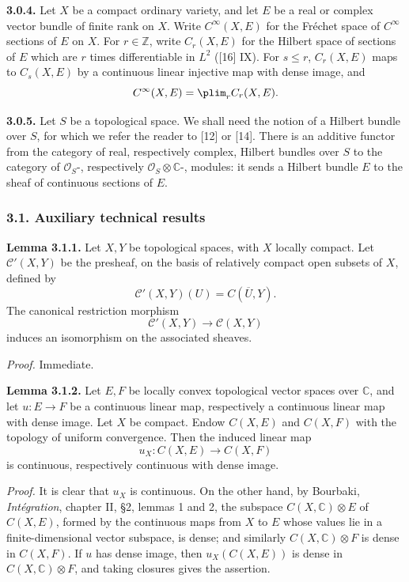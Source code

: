 \textbf{3.0.4.} Let $X$ be a compact ordinary variety, and let $E$ be a real or complex vector bundle of finite rank on $X$. Write $C^\infty(X,E)$ for the Fréchet space of $C^\infty$ sections of $E$ on $X$. For $r\in\mathbb Z$, write $C_r(X,E)$ for the Hilbert space of sections of $E$ which are $r$ times differentiable in $L^2$ ([16] IX). For $s\le r$, $C_r(X,E)$ maps to $C_s(X,E)$ by a continuous linear injective map with dense image, and
\[
 C^\infty(X,E)=\plim_r C_r(X,E).
\]

\textbf{3.0.5.} Let $S$ be a topological space. We shall need the notion of a Hilbert bundle over $S$, for which we refer the reader to [12] or [14]. There is an additive functor from the category of real, respectively complex, Hilbert bundles over $S$ to the category of $\mathcal O_S$-, respectively $\mathcal O_S\otimes\mathbb C$-, modules: it sends a Hilbert bundle $E$ to the sheaf of continuous sections of $E$.

\subsubsection*{3.1. Auxiliary technical results}

\textbf{Lemma 3.1.1.} Let $X,Y$ be topological spaces, with $X$ locally compact. Let $\mathcal C'(X,Y)$ be the presheaf, on the basis of relatively compact open subsets of $X$, defined by
\[
 \mathcal C'(X,Y)(U)=C(\overline U,Y).
\]
The canonical restriction morphism
\[
 \mathcal C'(X,Y)\longrightarrow \mathcal C(X,Y)
\]
induces an isomorphism on the associated sheaves.

\emph{Proof.} Immediate.

\textbf{Lemma 3.1.2.} Let $E,F$ be locally convex topological vector spaces over $\mathbb C$, and let $u:E\to F$ be a continuous linear map, respectively a continuous linear map with dense image. Let $X$ be compact. Endow $C(X,E)$ and $C(X,F)$ with the topology of uniform convergence. Then the induced linear map
\[
 u_X:C(X,E)\longrightarrow C(X,F)
\]
is continuous, respectively continuous with dense image.

\emph{Proof.} It is clear that $u_X$ is continuous. On the other hand, by Bourbaki, \emph{Intégration}, chapter II, §2, lemmas 1 and 2, the subspace $C(X,\mathbb C)\otimes E$ of $C(X,E)$, formed by the continuous maps from $X$ to $E$ whose values lie in a finite-dimensional vector subspace, is dense; and similarly $C(X,\mathbb C)\otimes F$ is dense in $C(X,F)$. If $u$ has dense image, then $u_X(C(X,E))$ is dense in $C(X,\mathbb C)\otimes F$, and taking closures gives the assertion.

